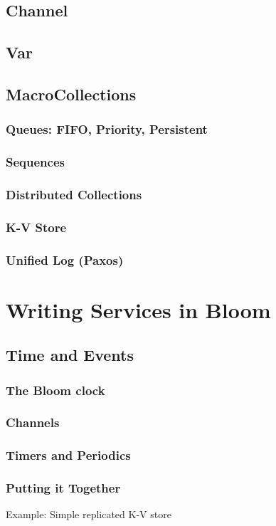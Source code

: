 \documentclass[]{book}
\begin{document}
    \section{Channel}
    \section{Var}
    \section{MacroCollections}
        \subsection{Queues: FIFO, Priority, Persistent}
        \subsection{Sequences}
        \subsection{Distributed Collections}
        \subsection{K-V Store}
        \subsection{Unified Log (Paxos)}

\chapter{Writing Services in Bloom}
    \section{Time and Events}
        \subsection{The Bloom clock}
        \subsection{Channels}
        \subsection{Timers and Periodics}
        \subsection{Putting it Together}
        Example: Simple replicated K-V store
\end{document}
